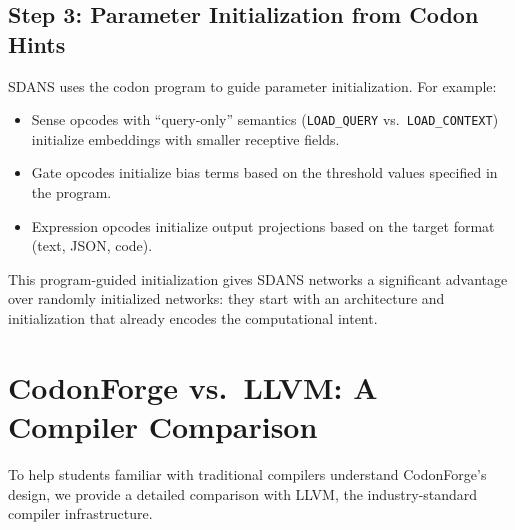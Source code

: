 \subsection{Step 3: Parameter Initialization from Codon Hints}

SDANS uses the codon program to guide parameter initialization. For example:
\begin{itemize}[leftmargin=1.8em]
  \item Sense opcodes with ``query-only'' semantics (\texttt{LOAD\_QUERY} vs.\ \texttt{LOAD\_CONTEXT}) initialize embeddings with smaller receptive fields.
  \item Gate opcodes initialize bias terms based on the threshold values specified in the program.
  \item Expression opcodes initialize output projections based on the target format (text, JSON, code).
\end{itemize}

This program-guided initialization gives SDANS networks a significant advantage over randomly initialized networks: they start with an architecture and initialization that already encodes the computational intent.


\section{CodonForge vs.\ LLVM: A Compiler Comparison}
\label{sec:compiler-comparison}

To help students familiar with traditional compilers understand CodonForge's design, we provide a detailed comparison with LLVM, the industry-standard compiler infrastructure.

